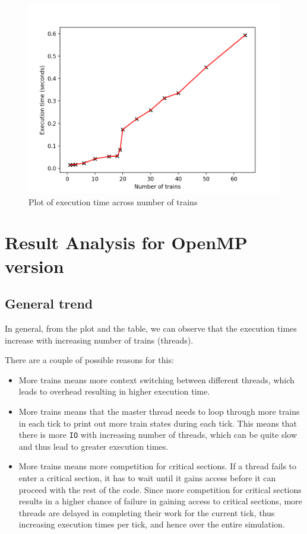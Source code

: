 \documentclass[12pt]{article}
\begin{document}
\begin{figure}
	\includegraphics{execution_times}
	\caption{Plot of execution time across number of trains}
\end{figure}

\section{Result Analysis for OpenMP version}

\subsection{General trend}

In general, from the plot and the table, we can observe that the execution times increase with increasing number of trains (threads). 

\bigbreak \noindent There are a couple of possible reasons for this:
\begin{itemize}
	\item More trains means more context switching between different threads, which leads to overhead resulting in higher execution time.
	\item More trains means that the master thread needs to loop through more trains in each tick to print out more train states during each tick. This means that there is more \verb!IO! with increasing number of threads, which can be quite slow and thus lead to greater execution times.
	\item More trains means more competition for critical sections. If a thread fails to enter a critical section, it has to wait until it gains access before it can proceed with the rest of the code. Since more competition for critical sections results in a higher chance of failure in gaining access to critical sections, more threads are delayed in completing their work for the current tick, thus increasing execution times per tick, and hence over the entire simulation.
\end{itemize}
\end{document}
